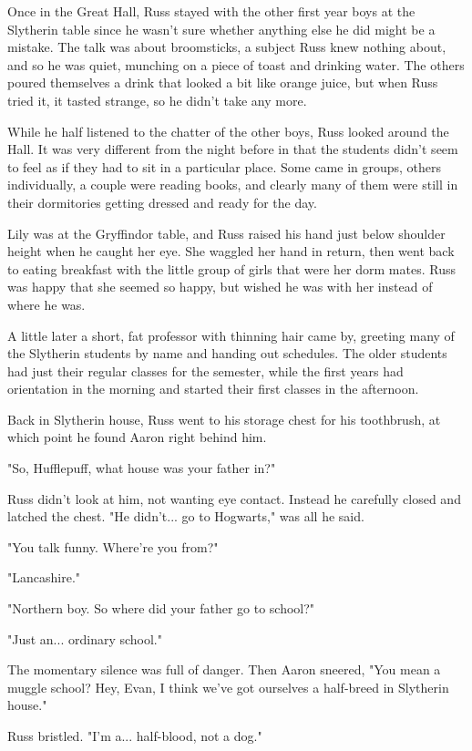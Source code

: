 \documentclass[a4paper,11pt]{article}
\begin{document}
Once in the Great Hall, Russ stayed with the other first year boys at the Slytherin table since he wasn't sure whether anything else he did might be a mistake. The talk was about broomsticks, a subject Russ knew nothing about, and so he was quiet, munching on a piece of toast and drinking water. The others poured themselves a drink that looked a bit like orange juice, but when Russ tried it, it tasted strange, so he didn't take any more.

While he half listened to the chatter of the other boys, Russ looked around the Hall. It was very different from the night before in that the students didn't seem to feel as if they had to sit in a particular place. Some came in groups, others individually, a couple were reading books, and clearly many of them were still in their dormitories getting dressed and ready for the day.

Lily was at the Gryffindor table, and Russ raised his hand just below shoulder height when he caught her eye. She waggled her hand in return, then went back to eating breakfast with the little group of girls that were her dorm mates. Russ was happy that she seemed so happy, but wished he was with her instead of where he was.

A little later a short, fat professor with thinning hair came by, greeting many of the Slytherin students by name and handing out schedules. The older students had just their regular classes for the semester, while the first years had orientation in the morning and started their first classes in the afternoon.

Back in Slytherin house, Russ went to his storage chest for his toothbrush, at which point he found Aaron right behind him.

"So, Hufflepuff, what house was your father in?"

Russ didn't look at him, not wanting eye contact. Instead he carefully closed and latched the chest. "He didn't... go to Hogwarts," was all he said.

"You talk funny. Where're you from?"

"Lancashire."

"Northern boy. So where did your father go to school?"

"Just an... ordinary school."

The momentary silence was full of danger. Then Aaron sneered, "You mean a muggle school? Hey, Evan, I think we've got ourselves a half-breed in Slytherin house."

Russ bristled. "I'm a... half-blood, not a dog."
\end{document}
